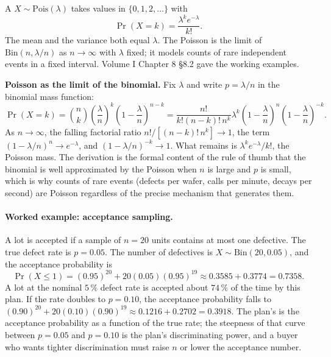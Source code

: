 A  $X \sim \mathrm{Pois}(\lambda)$
takes values in $\{0, 1, 2, \ldots\}$ with
\[
\Pr(X = k) = \frac{\lambda^{k} e^{-\lambda}}{k!}.
\]
The mean and the variance both equal $\lambda$. The Poisson is the
limit of $\mathrm{Bin}(n, \lambda/n)$ as $n \to \infty$ with
$\lambda$ fixed; it models counts of rare independent events in a
fixed interval. Volume I Chapter 8 §8.2 gave the working examples.

\begin{mastery}
\textbf{Poisson as the limit of the binomial.} Fix $\lambda$ and
write $p = \lambda/n$ in the binomial mass function:
\[
\Pr(X = k) = \binom{n}{k}\left(\frac{\lambda}{n}\right)^{k}
\left(1 - \frac{\lambda}{n}\right)^{n - k}
= \frac{n!}{k!(n - k)! \, n^{k}} \lambda^{k}
\left(1 - \frac{\lambda}{n}\right)^{n}
\left(1 - \frac{\lambda}{n}\right)^{-k}.
\]
As $n \to \infty$, the falling factorial ratio
$n!/[(n - k)! \, n^{k}] \to 1$, the term $(1 - \lambda/n)^{n} \to
e^{-\lambda}$, and $(1 - \lambda/n)^{-k} \to 1$. What remains is
$\lambda^{k} e^{-\lambda}/k!$, the Poisson mass. The derivation is
the formal content of the rule of thumb that the binomial is well
approximated by the Poisson when $n$ is large and $p$ is small,
which is why counts of rare events (defects per wafer, calls per
minute, decays per second) are Poisson regardless of the precise
mechanism that generates them.
\end{mastery}

\paragraph{Worked example: acceptance sampling.} A lot is accepted
if a sample of $n = 20$ units contains at most one defective. The
true defect rate is $p = 0.05$. The number of defectives is
$X \sim \mathrm{Bin}(20, 0.05)$, and the acceptance probability is
\[
\Pr(X \leq 1) = (0.95)^{20} + 20(0.05)(0.95)^{19}
\approx 0.3585 + 0.3774 = 0.7358.
\]
A lot at the nominal $5\,\%$ defect rate is accepted about $74\,\%$
of the time by this plan. If the rate doubles to $p = 0.10$, the
acceptance probability falls to $(0.90)^{20} + 20(0.10)(0.90)^{19}
\approx 0.1216 + 0.2702 = 0.3918$. The plan's  is the acceptance probability as a function
of the true rate; the steepness of that curve between $p = 0.05$ and
$p = 0.10$ is the plan's discriminating power, and a buyer who wants
tighter discrimination must raise $n$ or lower the acceptance
number.

